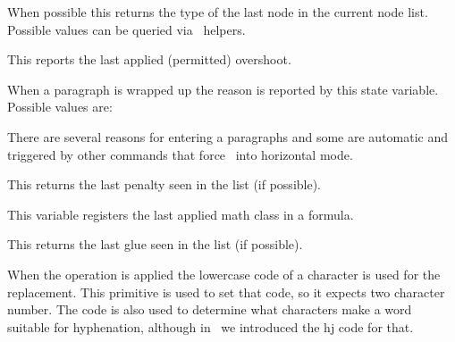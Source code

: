 \stopnewprimitive

\startoldprimitive[title={\prm {lastnodetype}}]

When possible this returns the type of the last node in the current node list.
Possible values can be queried via \LUA\ helpers.

\stopoldprimitive

\startnewprimitive[title={\prm {lastpageextra}}]

This reports the last applied (permitted) overshoot.

\stopnewprimitive

\startnewprimitive[title={\prm {lastparcontext}}]

When a paragraph is wrapped up the reason is reported by this state variable.
Possible values are:

\startfourrows
{}
\stopfourrows

\stopnewprimitive

\startnewprimitive[title={\prm {lastpartrigger}}]

There are several reasons for entering a paragraphs and some are automatic and
triggered by other commands that force \TEX\ into horizontal mode.

\startfourrows
{}
\stopfourrows

\stopnewprimitive

\startoldprimitive[title={\prm {lastpenalty}}]

This returns the last penalty seen in the list (if possible).

\stopoldprimitive

\startnewprimitive[title={\prm {lastrightclass}}]

This variable registers the last applied math class in a formula.

\stopnewprimitive

\startoldprimitive[title={\prm {lastskip}}]

This returns the last glue seen in the list (if possible).

\stopoldprimitive

\startoldprimitive[title={\prm {lccode}}]

When the  operation is applied the lowercase code of a character
is used for the replacement. This primitive is used to set that code, so it
expects two character number. The code is also used to determine what characters
make a word suitable for hyphenation, although in \LUATEX\ we introduced the \prm
{hj} code for that.

